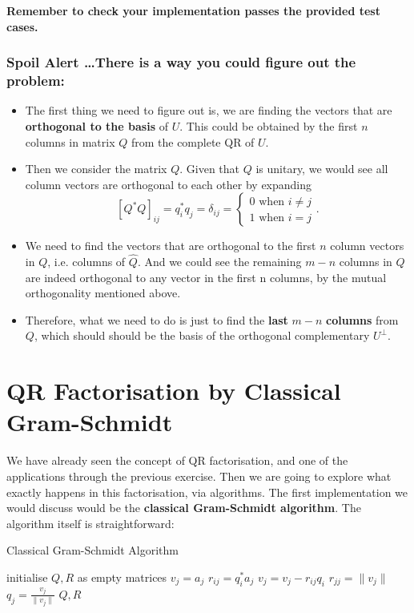 \noindent \textbf{Remember to check your implementation passes the provided test cases.}
\newpage

\subsubsection*{Spoil Alert \ldots There is a way you could figure out the problem:}%
\begin{itemize}
\item The first thing we need to figure out is, we are finding the vectors that are \textbf{orthogonal to the basis} of \(U\). This could be obtained by the first \(n\) columns in matrix \(Q\) from the complete QR of \(U\).
\item Then we consider the matrix \(Q\). Given that $Q$ is unitary, we would see all column vectors are orthogonal to each other by expanding
  \[
    [Q^*Q]_{ij} = q_i^*q_j = \delta_{ij} = \left\{
      \begin{array}{l}
      0 \text{ when $i \neq j$} \\
      1 \text{ when $i = j$}
      \end{array}
    \right.
  .\] 
  \item We need to find the vectors that are orthogonal to the first \(n\)  column vectors in $Q$, i.e. columns of \(\hat{Q}\). And we could see the remaining $m - n$ columns in  $Q$ are indeed orthogonal to any vector in the first n columns, by the mutual orthogonality mentioned above. 
  \item Therefore, what we need to do is just to find the \textbf{last} $m - n$ \textbf{columns} from $Q$, which should should be the basis of the orthogonal complementary $U^{\bot}$.
\end{itemize}

\newpage
\section{QR Factorisation by Classical Gram-Schmidt}%
We have already seen the concept of QR factorisation, and one of the applications through the previous exercise. Then we are going to explore what exactly happens in this factorisation, via algorithms. The first implementation we would discuss would be the \textbf{classical Gram-Schmidt algorithm}. The algorithm itself is straightforward:
\begin{algorithm}
  \caption{Classical Gram-Schmidt Algorithm}
  \begin{algorithmic}[1]
    \State initialise \(Q, R\)  as empty matrices
      \State \(v_j = a_j\)
        \State \(r_{ij} = q_i^{*}a_j\)
        \State \(v_j = v_j - r_{ij}q_i\)
      \EndFor
      \State \(r_{jj} = \|v_j\|\)  
      \State \(q_j = \frac{v_j}{\|v_j\|}\)
    \EndFor
    \State \Return \(Q, R\)
  \EndProcedure
  \end{algorithmic}
\end{algorithm}

